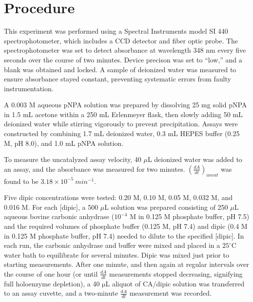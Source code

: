 \section{Procedure}
This experiment was performed using a Spectral Instruments model SI 440 spectrophotometer, which includes a CCD detector and fiber optic probe. The spectrophotometer was set to detect absorbance at wavelength 348 nm every five seconds over the course of two minutes. Device precison was set to ``low,'' and a blank was obtained and locked. A sample of deionized water was measured to ensure absorbance stayed constant, preventing systematic errors from faulty instrumentation.

A 0.003 M aqueous pNPA solution was prepared by dissolving 25 mg solid pNPA in 1.5 mL acetone within a 250 mL Erlenmeyer flask, then slowly adding 50 mL deionized water while stirring vigorously to prevent precipitation. Assays were constructed by combining 1.7 mL deionized water, 0.3 mL HEPES buffer (0.25 M, pH 8.0), and 1.0 mL pNPA solution.

To measure the uncatalyzed assay velocity, 40 $\mu$L deionized water was added to an assay, and the absorbance was measured for two minutes. $\left( \frac{dA}{dt} \right)_{uncat}$ was found to be $3.18\times10^{-5}\ min^{-1}$.

Five dipic concentrations were tested: 0.20 M, 0.10 M, 0.05 M, 0.032 M, and 0.016 M. For each [dipic], a 500 $\mu$L solution was prepared consisting of 250 $\mu$L aqueous bovine carbonic anhydrase ($10^{-4}$ M in 0.125 M phosphate buffer, pH 7.5) and the required volumes of phosphate buffer (0.125 M, pH 7.4) and dipic (0.4 M in 0.125 M phosphate buffer, pH 7.4) needed to dilute to the specified [dipic]. In each run, the carbonic anhydrase and buffer were mixed and placed in a $25^{\circ}$C water bath to equilibrate for several minutes. Dipic was mixed just prior to starting measurements. After one minute, and then again at regular intervals over the course of one hour (or until $\frac{dA}{dt}$ measurements stopped decreasing, signifying full holoenzyme depletion), a 40 $\mathrm{\mu}$L aliquot of CA/dipic solution was transferred to an assay cuvette, and a two-minute $\frac{dA}{dt}$ measurement was recorded. 